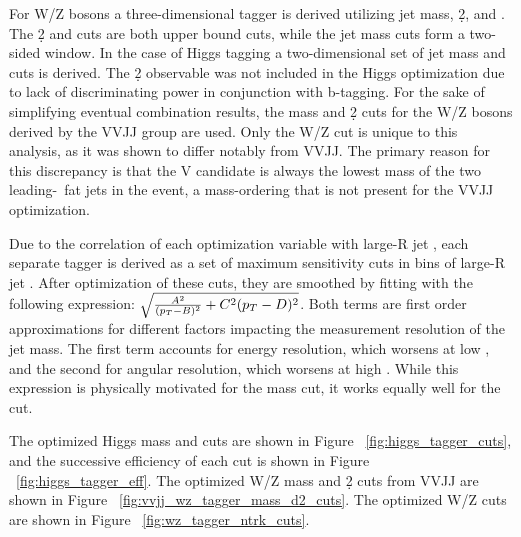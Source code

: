For W/Z bosons a three-dimensional tagger is derived utilizing jet mass, \d2, and \ntrk.
The \d2 and \ntrk cuts are both upper bound cuts, while the jet mass cuts form a two-sided window.
In the case of Higgs tagging a two-dimensional set of jet mass and \ntrk cuts is derived.
The \d2 observable was not included in the Higgs optimization due to lack of discriminating power in conjunction with b-tagging.
For the sake of simplifying eventual combination results, the mass and \d2 cuts for the W/Z bosons derived by the VVJJ group are used.
Only the W/Z \ntrk cut is unique to this analysis, as it was shown to differ notably from VVJJ.
The primary reason for this discrepancy is that the V candidate is always the lowest mass of the two leading-\pt\ fat jets in the event, a mass-ordering that is not present for the VVJJ optimization.

Due to the correlation of each optimization variable with large-R jet \pt, each separate tagger is derived as a set of maximum sensitivity cuts in bins of large-R jet \pt.
After optimization of these cuts, they are smoothed by fitting with the following expression: $\sqrt{\frac{A^2}{(p_{T}-B)^2} + C^2(p_{T}-D)^2}$.
Both terms are first order approximations for different factors impacting the measurement resolution of the jet mass.
The first term accounts for energy resolution, which worsens at low \pt, and the second for angular resolution, which worsens at high \pt.
While this expression is physically motivated for the mass cut, it works equally well for the \ntrk cut.

The optimized Higgs mass and \ntrk cuts are shown in Figure ~\ref{fig:higgs_tagger_cuts}, and the successive efficiency of each cut is shown in Figure ~\ref{fig:higgs_tagger_eff}.
The optimized W/Z mass and \d2 cuts from VVJJ are shown in Figure ~\ref{fig:vvjj_wz_tagger_mass_d2_cuts}.
The optimized W/Z \ntrk cuts are shown in Figure ~\ref{fig:wz_tagger_ntrk_cuts}.

